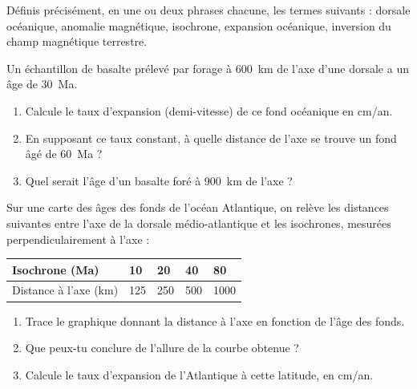 \documentclass[11pt]{article}
\newcommand{\cle}[1]{{\popxbold\color{popdark}#1}}
\newcounter{popsec}
\newcounter{popsub}
\newcommand{\courssub}[1]{%
  \stepcounter{popsub}%
  \par\vspace{9pt}\noindent{\popxbold\fontsize{11.5}{13}\selectfont\color{popink}{\color{poporange}\thepopsec.\thepopsub}\hspace{6pt}#1}\par\nopagebreak\vspace{4pt}
}
\begin{document}
\begin{exercice}[Définitions]
Définis précisément, en une ou deux phrases chacune, les termes suivants : \cle{dorsale océanique}, \cle{anomalie magnétique}, \cle{isochrone}, \cle{expansion océanique}, \cle{inversion du champ magnétique terrestre}.
\end{exercice}

\begin{exercice}
Un échantillon de basalte prélevé par forage à \SI{600}{km} de l'axe d'une dorsale a un âge de \SI{30}{Ma}.
\begin{enumerate}
\item Calcule le taux d'expansion (demi-vitesse) de ce fond océanique en cm/an.
\item En supposant ce taux constant, à quelle distance de l'axe se trouve un fond âgé de \SI{60}{Ma} ?
\item Quel serait l'âge d'un basalte foré à \SI{900}{km} de l'axe ?
\end{enumerate}
\end{exercice}

\courssub{Je m'entraîne}

\begin{exercice}
Sur une carte des âges des fonds de l'océan Atlantique, on relève les distances suivantes entre l'axe de la dorsale médio-atlantique et les isochrones, mesurées perpendiculairement à l'axe :
\begin{center}
\begin{tabularx}{\linewidth}{|l|X|X|X|X|}
\hline
\rowcolor{popblueL} Isochrone (Ma) & 10 & 20 & 40 & 80 \\
\hline
Distance à l'axe (km) & 125 & 250 & 500 & 1000 \\
\hline
\end{tabularx}
\end{center}
\begin{enumerate}
\item Trace le graphique donnant la distance à l'axe en fonction de l'âge des fonds.
\item Que peux-tu conclure de l'allure de la courbe obtenue ?
\item Calcule le taux d'expansion de l'Atlantique à cette latitude, en cm/an.
\end{enumerate}
\end{exercice}
\end{document}
